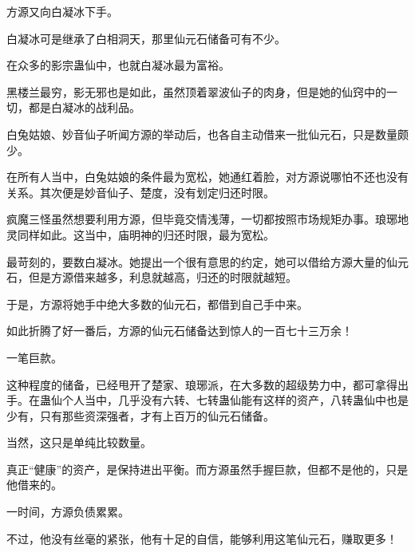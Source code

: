 \begin{this_body}
方源又向白凝冰下手。

白凝冰可是继承了白相洞天，那里仙元石储备可有不少。

在众多的影宗蛊仙中，也就白凝冰最为富裕。

黑楼兰最穷，影无邪也是如此，虽然顶着翠波仙子的肉身，但是她的仙窍中的一切，都是白凝冰的战利品。

白兔姑娘、妙音仙子听闻方源的举动后，也各自主动借来一批仙元石，只是数量颇少。

在所有人当中，白兔姑娘的条件最为宽松，她通红着脸，对方源说哪怕不还也没有关系。其次便是妙音仙子、楚度，没有划定归还时限。

疯魔三怪虽然想要利用方源，但毕竟交情浅薄，一切都按照市场规矩办事。琅琊地灵同样如此。这当中，庙明神的归还时限，最为宽松。

最苛刻的，要数白凝冰。她提出一个很有意思的约定，她可以借给方源大量的仙元石，但是方源借来越多，利息就越高，归还的时限就越短。

于是，方源将她手中绝大多数的仙元石，都借到自己手中来。

如此折腾了好一番后，方源的仙元石储备达到惊人的一百七十三万余！

一笔巨款。

这种程度的储备，已经甩开了楚家、琅琊派，在大多数的超级势力中，都可拿得出手。在蛊仙个人当中，几乎没有六转、七转蛊仙能有这样的资产，八转蛊仙中也是少有，只有那些资深强者，才有上百万的仙元石储备。

当然，这只是单纯比较数量。

真正“健康”的资产，是保持进出平衡。而方源虽然手握巨款，但都不是他的，只是他借来的。

一时间，方源负债累累。

不过，他没有丝毫的紧张，他有十足的自信，能够利用这笔仙元石，赚取更多！

\end{this_body}

